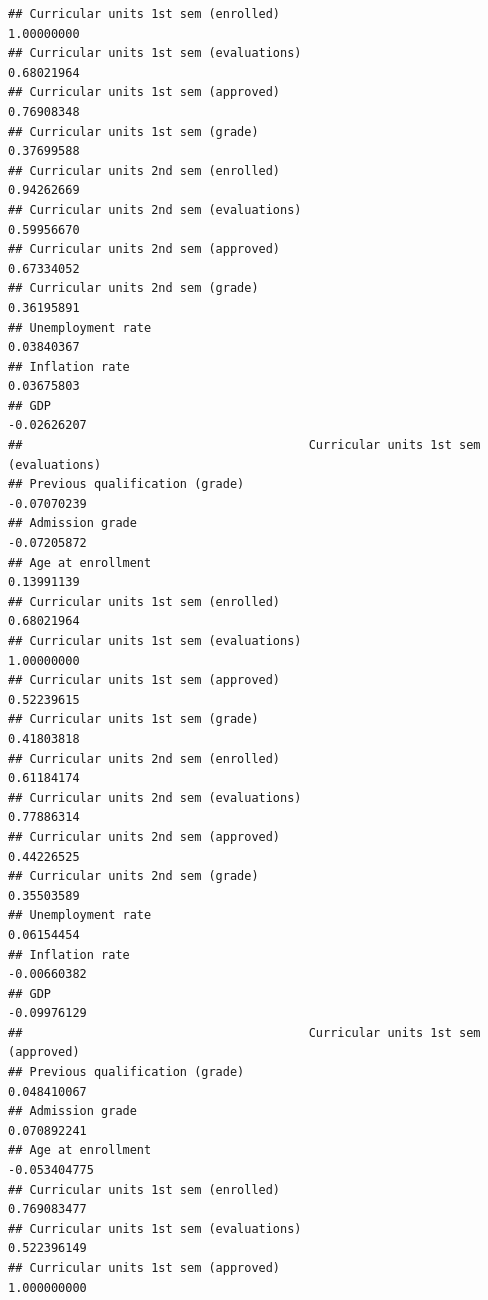 \documentclass[
]{article}
\begin{document}
\begin{verbatim}
## Curricular units 1st sem (enrolled)                             1.00000000
## Curricular units 1st sem (evaluations)                          0.68021964
## Curricular units 1st sem (approved)                             0.76908348
## Curricular units 1st sem (grade)                                0.37699588
## Curricular units 2nd sem (enrolled)                             0.94262669
## Curricular units 2nd sem (evaluations)                          0.59956670
## Curricular units 2nd sem (approved)                             0.67334052
## Curricular units 2nd sem (grade)                                0.36195891
## Unemployment rate                                               0.03840367
## Inflation rate                                                  0.03675803
## GDP                                                            -0.02626207
##                                        Curricular units 1st sem (evaluations)
## Previous qualification (grade)                                    -0.07070239
## Admission grade                                                   -0.07205872
## Age at enrollment                                                  0.13991139
## Curricular units 1st sem (enrolled)                                0.68021964
## Curricular units 1st sem (evaluations)                             1.00000000
## Curricular units 1st sem (approved)                                0.52239615
## Curricular units 1st sem (grade)                                   0.41803818
## Curricular units 2nd sem (enrolled)                                0.61184174
## Curricular units 2nd sem (evaluations)                             0.77886314
## Curricular units 2nd sem (approved)                                0.44226525
## Curricular units 2nd sem (grade)                                   0.35503589
## Unemployment rate                                                  0.06154454
## Inflation rate                                                    -0.00660382
## GDP                                                               -0.09976129
##                                        Curricular units 1st sem (approved)
## Previous qualification (grade)                                 0.048410067
## Admission grade                                                0.070892241
## Age at enrollment                                             -0.053404775
## Curricular units 1st sem (enrolled)                            0.769083477
## Curricular units 1st sem (evaluations)                         0.522396149
## Curricular units 1st sem (approved)                            1.000000000

\end{verbatim}
\end{document}
